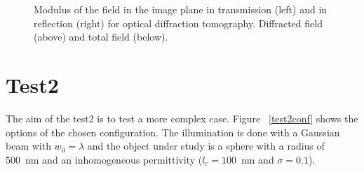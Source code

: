\begin{figure}[H]
\begin{center}
\begin{tabular}{cc}
\end{tabular}

\end{center}
\caption{Modulus of the field in the image plane in transmission
  (left) and in reflection (right) for optical diffraction tomography.
  Diffracted field (above) and total field (below).}
\end{figure}

\section{Test2}

The aim of the test2 is to test a more complex case.  Figure~
\ref{test2conf} shows the options of the chosen configuration. The
illumination is done with a Gaussian beam with $w_0=\lambda$ and the
object under study is a sphere with a radius of 500~nm and an
inhomogeneous permittivity ($l_c=100$~nm and $\sigma=0.1$).

